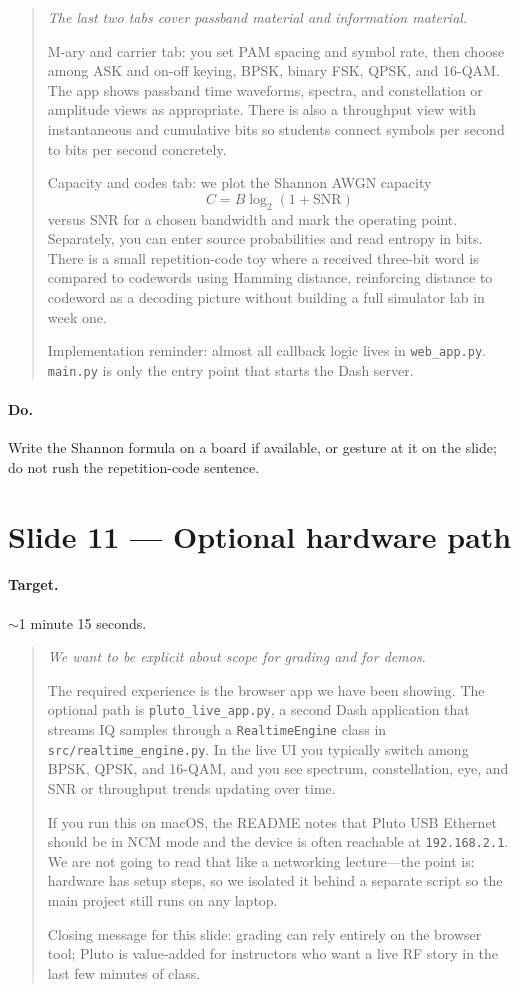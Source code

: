 \documentclass[11pt,a4paper]{article}
\newcommand{\speak}[1]{%
  \begin{quote}\itshape #1\end{quote}%
}
\newcommand{\doitem}[1]{\paragraph{Do.} #1\par\vspace{0.6em}}
\begin{document}
\speak{%
The last two tabs cover passband material and information material.

M-ary and carrier tab: you set PAM spacing and symbol rate, then choose among ASK and on-off keying, BPSK, binary FSK, QPSK, and 16-QAM. The app shows passband time waveforms, spectra, and constellation or amplitude views as appropriate. There is also a throughput view with instantaneous and cumulative bits so students connect symbols per second to bits per second concretely.

Capacity and codes tab: we plot the Shannon AWGN capacity
\[
  C = B \log_2(1 + \mathrm{SNR})
\]
versus SNR for a chosen bandwidth and mark the operating point. Separately, you can enter source probabilities and read entropy in bits. There is a small repetition-code toy where a received three-bit word is compared to codewords using Hamming distance, reinforcing distance to codeword as a decoding picture without building a full simulator lab in week one.

Implementation reminder: almost all callback logic lives in \texttt{web\_app.py}. \texttt{main.py} is only the entry point that starts the Dash server.%
}

\doitem{Write the Shannon formula on a board if available, or gesture at it on the slide; do not rush the repetition-code sentence.}

\section{Slide 11 --- Optional hardware path}

\paragraph{Target.} $\sim$1 minute 15 seconds.

\speak{%
We want to be explicit about scope for grading and for demos.

The required experience is the browser app we have been showing. The optional path is \texttt{pluto\_live\_app.py}, a second Dash application that streams IQ samples through a \texttt{RealtimeEngine} class in \texttt{src/realtime\_engine.py}. In the live UI you typically switch among BPSK, QPSK, and 16-QAM, and you see spectrum, constellation, eye, and SNR or throughput trends updating over time.

If you run this on macOS, the README notes that Pluto USB Ethernet should be in NCM mode and the device is often reachable at \texttt{192.168.2.1}. We are not going to read that like a networking lecture---the point is: hardware has setup steps, so we isolated it behind a separate script so the main project still runs on any laptop.

Closing message for this slide: grading can rely entirely on the browser tool; Pluto is value-added for instructors who want a live RF story in the last few minutes of class.%
}
\end{document}
